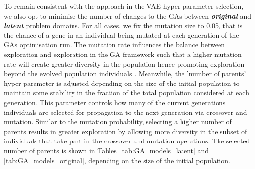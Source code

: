 \documentclass{article}
\begin{document}
\begin{table}[h]
\centering
{}
\caption{Genetic Algorithm Tested Optimisation Tasks for Original Resolution Shape Representations}
\label{tab:GA_models_original}
\end{table}

To remain consistent with the approach in the VAE hyper-parameter selection, we also opt to minimise the number of changes to the GAs between \textbf{\textit{original}} and \textbf{\textit{latent}} problem domains. For all cases, we fix the mutation size to 0.05, that is the chance of a gene in an individual being mutated \citep{Hassanat2019} at each generation of the GAs optimisation run. The mutation rate influences the balance between exploration and exploration in the GA framework such that a higher mutation rate will create greater diversity in the population hence promoting exploration beyond the evolved population individuals \citep{Hussain2020}. Meanwhile, the 'number of parents' hyper-parameter is adjusted depending on the size of the initial population to maintain some stability in the fraction of the total population considered at each generation. This parameter controls how many of the current generations individuals are selected for propagation to the next generation via crossover and mutation. Similar to the mutation probability, selecting a higher number of parents results in greater exploration by allowing more diversity in the subset of individuals that take part in the crossover and mutation operations. The selected number of parents is shown in Tables~\ref{tab:GA_models_latent} and \ref{tab:GA_models_original}, depending on the size of the initial population.
\end{document}
